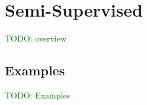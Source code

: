 \section{Semi-Supervised}

\textcolor{green}{TODO: overview}

\subsection{Examples}

\textcolor{green}{TODO: Examples}